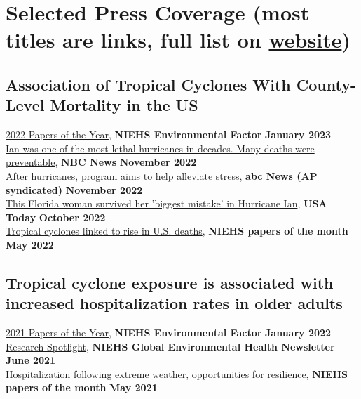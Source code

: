 \section*{Selected Press Coverage (most titles are links, full list on \href{https://robbiemparks.github.io/press/}{website})}


\subsection*{Association of Tropical Cyclones With County-Level Mortality in the US}

\href{https://factor.niehs.nih.gov/2023/1/science-highlights/papers-of-the-year}{2022 Papers of the Year}, \textbf{NIEHS Environmental Factor} \hfill \textbf{January 2023}\\
\href{https://www.nbcnews.com/news/us-news/hurricane-ian-florida-death-toll-rcna54069}{Ian was one of the most lethal hurricanes in decades. Many deaths were preventable}, \textbf{NBC News} \hfill \textbf{November 2022}\\
\href{https://abcnews.go.com/Health/wireStory/hurricanes-program-aims-alleviate-stress-93206352}{After hurricanes, program aims to help alleviate stress}, \textbf{abc News (AP syndicated)} \hfill \textbf{November 2022}\\
\href{https://www.usatoday.com/story/news/nation/2022/10/04/hurricane-ian-florida-death-toll/8168820001/}{This Florida woman survived her 'biggest mistake' in Hurricane Ian}, \textbf{USA Today} \hfill \textbf{October 2022}\\
\href{https://factor.niehs.nih.gov/2022/5/papers/dert/index.htm}{Tropical cyclones linked to rise in U.S. deaths}, \textbf{NIEHS papers of the month} \hfill \textbf{May 2022}

\subsection*{Tropical cyclone exposure is associated with increased hospitalization rates in older adults}

\href{https://factor.niehs.nih.gov/2022/1/papers/papers-of-the-year/index.htm}{2021 Papers of the Year}, \textbf{NIEHS Environmental Factor} \hfill \textbf{January 2022}\\
\href{https://www.niehs.nih.gov/research/programs/geh/geh_newsletter/2021/6/spotlight/hurricanes_and_tropical_cyclones_associated_with_increased_hospitalization_rates_in_older_adults.cfm}{Research Spotlight}, \textbf{NIEHS Global Environmental Health Newsletter} \hfill \textbf{June 2021}\\
\href{https://factor.niehs.nih.gov/2021/5/papers/dert/index.htm?utm_source=efactor-newsletter&utm_medium=email&utm_campaign=efactor-newsletter-2021-May#a3}{Hospitalization following extreme weather, opportunities for resilience}, \textbf{NIEHS papers of the month} \hfill \textbf{May 2021}

